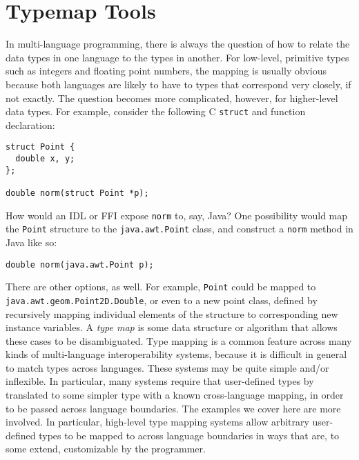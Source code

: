
\section{Typemap Tools}
\label{sec:background:typemap}

In multi-language programming, there is always the question of how to relate the data types in one language to the types in another. For low-level, primitive types such as integers and floating point numbers, the mapping is usually obvious because both languages are likely to have to types that correspond very closely, if not exactly. The question becomes more complicated, however, for higher-level data types. For example, consider the following C \texttt{struct} and function declaration:

\begin{verbatim}
struct Point {
  double x, y;
};

double norm(struct Point *p);
\end{verbatim}

How would an IDL or FFI expose \texttt{norm} to, say, Java? One possibility would map the \texttt{Point} structure to the \texttt{java.awt.Point} class, and construct a \texttt{norm} method in Java like so:

\begin{verbatim}
double norm(java.awt.Point p);
\end{verbatim}

There are other options, as well. For example, \texttt{Point} could be mapped to \texttt{java.awt.geom.Point2D.Double}, or even to a new point class, defined by recursively mapping individual elements of the structure to corresponding new instance variables. A \emph{type map} is some data structure or algorithm that allows these cases to be disambiguated. Type mapping is a common feature across many kinds of multi-language interoperability systems, because it is difficult in general to match types across languages. These systems may be quite simple and/or inflexible. In particular, many systems require that user-defined types by translated to some simpler type with a known cross-language mapping, in order to be passed across language boundaries. The examples we cover here are more involved. In particular, high-level type mapping systems allow arbitrary user-defined types to be mapped to across language boundaries in ways that are, to some extend, customizable by the programmer.


